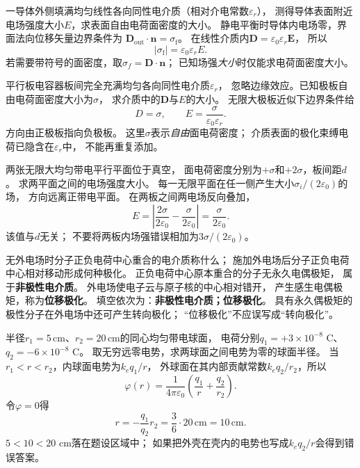 \problemtext 一导体外侧填满均匀线性各向同性电介质（相对介电常数$\varepsilon_r$），
测得导体表面附近电场强度大小$E$，求表面自由电荷面密度的大小。
\workings
静电平衡时导体内电场零，界面法向位移矢量边界条件为
$\bm D_{\mathrm{out}}\cdot\bm n=\sigma_{\mathrm f}$。
在线性介质内$\bm D=\varepsilon_0\varepsilon_r\bm E$，
所以
\[
\boxed{|\sigma_{\mathrm f}|=\varepsilon_0\varepsilon_r E}.
\]
\crosscheck 若需要带符号的面密度，取$\sigma_f=\bm D\cdot\bm n$；
已知场强\emph{大小}时仅能求电荷面密度大小。

\problemtext 平行板电容器板间完全充满均匀各向同性电介质$\varepsilon_r$，
忽略边缘效应。已知极板自由电荷面密度大小为$\sigma$，
求介质中的$\bm D$与$E$的大小。
\workings
无限大极板近似下边界条件给
\[
\boxed{D=\sigma},\qquad
\boxed{E=\frac{\sigma}{\varepsilon_0\varepsilon_r}}.
\]
方向由正极板指向负极板。
\crosscheck 这里$\sigma$表示\emph{自由}面电荷密度；
介质表面的极化束缚电荷已隐含在$\varepsilon_r$中，
不能再重复添加。

\problemtext 两张无限大均匀带电平行平面位于真空，
面电荷密度分别为$+\sigma$和$+2\sigma$，板间距$d$。
求两平面之间的电场强度大小。
\workings
每一无限平面在任一侧产生大小$\sigma_i/(2\varepsilon_0)$的场，
方向远离正带电平面。
在两板之间两电场反向叠加，
\[
\boxed{E=\left|\frac{2\sigma}{2\varepsilon_0}
-\frac{\sigma}{2\varepsilon_0}\right|
=\frac{\sigma}{2\varepsilon_0}}.
\]
\crosscheck 该值与$d$无关；
不要将两板内场强错误相加为$3\sigma/(2\varepsilon_0)$。

\problemtext 无外电场时分子正负电荷中心重合的电介质称什么；
施加外电场后分子正负电荷中心相对移动形成何种极化。
\workings
正负电荷中心原本重合的分子无永久电偶极矩，
属于\textbf{非极性电介质}。
外电场使电子云与原子核的中心相对错开，
产生感生电偶极矩，称为\textbf{位移极化}。
填空依次为：\textbf{非极性电介质；位移极化}。
\crosscheck 具有永久偶极矩的极性分子在外电场中还可产生转向极化；
“位移极化”不应误写成“转向极化”。

\problemtext 半径$r_1=5\,\mathrm{cm}$、$r_2=20\,\mathrm{cm}$的同心均匀带电球面，
电荷分别$q_1=+3\times10^{-8}$ C、$q_2=-6\times10^{-8}$ C。
取无穷远零电势，求两球面之间电势为零的球面半径。
\workings
当$r_1<r<r_2$，内球面电势为$k_eq_1/r$，
外球面在其内部贡献常数$k_eq_2/r_2$，所以
\[
\varphi(r)=\frac{1}{4\pi\varepsilon_0}
\left(\frac{q_1}{r}+\frac{q_2}{r_2}\right).
\]
令$\varphi=0$得
\[
\boxed{r=-\frac{q_1}{q_2}r_2
=\frac{3}{6}\cdot20\,\mathrm{cm}
=10\,\mathrm{cm}}.
\]
\crosscheck $5<10<20$ cm落在题设区域中；
如果把外壳在壳内的电势也写成$k_eq_2/r$会得到错误答案。

